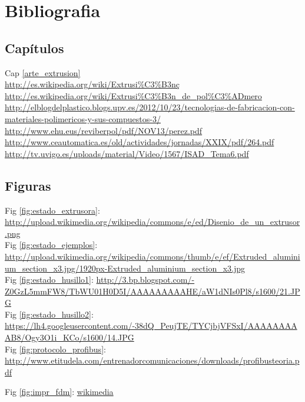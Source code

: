 \chapter{Bibliografia}
\label{bibliografia}
\section{Capítulos}
Cap \ref{arte_extrusion}\\
\url{http://es.wikipedia.org/wiki/Extrusi%C3%B3nç}\\
\url{http://es.wikipedia.org/wiki/Extrusi%C3%B3n_de_pol%C3%ADmero}\\
\url{http://elblogdelplastico.blogs.upv.es/2012/10/23/tecnologias-de-fabricacion-con-materiales-polimericos-y-sus-compuestos-3/}\\
\url{http://www.ehu.eus/reviberpol/pdf/NOV13/perez.pdf}\\

\url{http://www.ceautomatica.es/old/actividades/jornadas/XXIX/pdf/264.pdf}\\
\url{http://tv.uvigo.es/uploads/material/Video/1567/ISAD_Tema6.pdf}\\
\section{Figuras}
Fig \ref{fig:estado_extrusora}:  \url{http://upload.wikimedia.org/wikipedia/commons/e/ed/Disenio_de_un_extrusor.png}\\
Fig \ref{fig:estado_ejemplos}: \url{http://upload.wikimedia.org/wikipedia/commons/thumb/e/ef/Extruded_aluminium_section_x3.jpg/1920px-Extruded_aluminium_section_x3.jpg}\\
Fig \ref{fig:estado_husillo1}: \url{http://3.bp.blogspot.com/-Z0GzL5mmFW8/TbWU01H0D5I/AAAAAAAAAHE/aW1dNIs0Pl8/s1600/21.JPG}\\
Fig \ref{fig:estado_husillo2}: \url{https://lh4.googleusercontent.com/-38dQ_PeujTE/TYCjbjVFSxI/AAAAAAAAAB8/Ogy3O1i_KCo/s1600/14.JPG}\\
Fig \ref{fig:protocolo_profibus}: \url{http://www.etitudela.com/entrenadorcomunicaciones/downloads/profibusteoria.pdf}

Fig \ref{fig:impr_fdm}: 
\href{http://upload.wikimedia.org/wikipedia/commons/4/42/FDM_by_Zureks.png}{wikimedia}